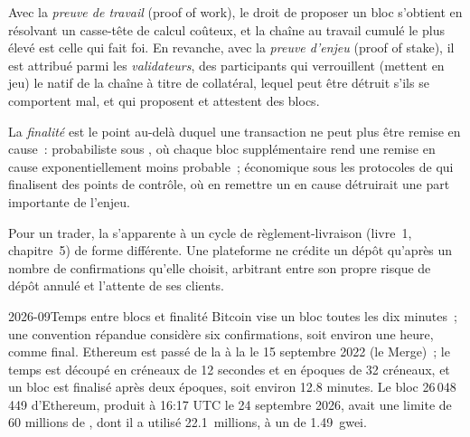 \begin{definition}\label{def:m3:blockchains-for-traders:pow}
Avec la \emph{preuve de travail} (proof of work), le droit de proposer un bloc s'obtient en résolvant un
casse-tête de calcul coûteux, et la chaîne au travail cumulé le plus élevé est celle qui fait foi. En revanche, avec la
\emph{preuve d'enjeu} (proof of stake), il est attribué parmi les \emph{validateurs},
des participants qui verrouillent (mettent en jeu) le  natif de la chaîne à titre de collatéral, lequel peut être détruit s'ils
se comportent mal, et qui proposent et attestent des blocs.
\end{definition}

\begin{definition}[Finalité]\label{def:m3:blockchains-for-traders:finality}
La \emph{finalité} est le point au-delà duquel une transaction ne peut plus être remise en cause~:
probabiliste sous , où chaque bloc supplémentaire rend une remise en cause exponentiellement moins probable~;
économique sous les protocoles de  qui finalisent des points de contrôle, où en remettre un en cause détruirait une
part importante de l'enjeu.
\end{definition}

Pour un trader, la  s'apparente à un cycle de règlement-livraison (livre~1, chapitre~5) de forme différente. Une
plateforme ne crédite un dépôt qu'après un nombre de confirmations qu'elle choisit, arbitrant entre son propre risque de
dépôt annulé et l'attente de ses clients.

\begin{dated}{2026-09}{Temps entre blocs et finalité}\label{dat:m3:blockchains-for-traders:times}
Bitcoin vise un bloc toutes les dix minutes~; une convention répandue considère six confirmations, soit environ une heure,
comme final. Ethereum est passé de la  à la  le 15 septembre 2022 (le Merge)~; le temps est
découpé en créneaux de 12 secondes et en époques de 32 créneaux, et un bloc est finalisé après deux époques, soit environ 12.8
minutes. Le bloc 26\,048\,449 d'Ethereum, produit à 16:17 UTC le 24 septembre 2026, avait une limite de 60 millions de ,
dont il a utilisé 22.1~millions, à un  de 1.49~gwei.
\end{dated}

